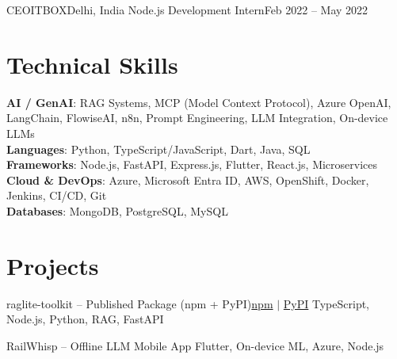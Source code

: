 \documentclass[a4paper,10pt]{article}
\begin{document}
    \resumeSubheading
      {CEOITBOX}{Delhi, India}
      {Node.js Development Intern}{Feb 2022 -- May 2022}
      \resumeItemListStart
      \resumeItemListEnd

  \resumeSubHeadingListEnd

\section{Technical Skills}
 \begin{itemize}[leftmargin=0.15in, label={}]
    \small{\item{
     \textbf{AI / GenAI}{: RAG Systems, MCP (Model Context Protocol), Azure OpenAI, LangChain, FlowiseAI, n8n, Prompt Engineering, LLM Integration, On-device LLMs} \\
     \textbf{Languages}{: Python, TypeScript/JavaScript, Dart, Java, SQL} \\
     \textbf{Frameworks}{: Node.js, FastAPI, Express.js, Flutter, React.js, Microservices} \\
     \textbf{Cloud \& DevOps}{: Azure, Microsoft Entra ID, AWS, OpenShift, Docker, Jenkins, CI/CD, Git} \\
     \textbf{Databases}{: MongoDB, PostgreSQL, MySQL}
    }}
 \end{itemize}

\section{Projects}
  \resumeSubHeadingListStart

    \resumeSubheading
      {raglite-toolkit -- Published Package (npm + PyPI)}{\href{https://www.npmjs.com/package/raglite-toolkit}{npm} $|$ \href{https://pypi.org/project/raglite-toolkit/}{PyPI}}
      {TypeScript, Node.js, Python, RAG, FastAPI}{}
      \resumeItemListStart
      \resumeItemListEnd

    \resumeSubheading
      {RailWhisp -- Offline LLM Mobile App}{}
      {Flutter, On-device ML, Azure, Node.js}{}
      \resumeItemListStart
      \resumeItemListEnd
\end{document}
